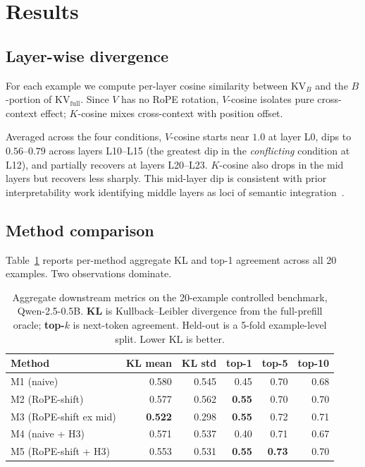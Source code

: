\section{Results}

\subsection{Layer-wise divergence}\label{sec:layers}

For each example we compute per-layer cosine similarity between $\mathrm{KV}_B$ and the $B$-portion of $\mathrm{KV}_{\text{full}}$. Since $V$ has no RoPE rotation, $V$-cosine isolates pure cross-context effect; $K$-cosine mixes cross-context with position offset.

Averaged across the four conditions, $V$-cosine starts near $1.0$ at layer L0, dips to $0.56$--$0.79$ across layers L10--L15 (the greatest dip in the \emph{conflicting} condition at L12), and partially recovers at layers L20--L23. $K$-cosine also drops in the mid layers but recovers less sharply. This mid-layer dip is consistent with prior interpretability work identifying middle layers as loci of semantic integration~\citep{elhage2022superposition}.

\subsection{Method comparison}\label{sec:m2}

Table~\ref{tab:main} reports per-method aggregate KL and top-1 agreement across all 20 examples. Two observations dominate.

\begin{table}[t]
\centering
\caption{Aggregate downstream metrics on the 20-example controlled benchmark, Qwen-2.5-0.5B. \textbf{KL} is Kullback--Leibler divergence from the full-prefill oracle; \textbf{top-$k$} is next-token agreement. Held-out is a 5-fold example-level split. Lower KL is better.}
\label{tab:main}
\begin{tabular}{lrrrrr}
\toprule
Method & KL mean & KL std & top-1 & top-5 & top-10 \\
\midrule
M1 (naive)              & 0.580 & 0.545 & 0.45 & 0.70 & 0.68 \\
M2 (RoPE-shift)          & 0.577 & 0.562 & \textbf{0.55} & 0.70 & 0.70 \\
M3 (RoPE-shift ex mid)   & \textbf{0.522} & 0.298 & \textbf{0.55} & 0.72 & 0.71 \\
M4 (naive + H3)          & 0.571 & 0.537 & 0.40 & 0.71 & 0.67 \\
M5 (RoPE-shift + H3)     & 0.553 & 0.531 & \textbf{0.55} & \textbf{0.73} & 0.70 \\
\bottomrule
\end{tabular}
\end{table}

